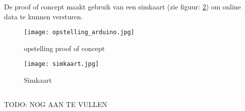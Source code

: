 De proof of concept maakt gebruik van een simkaart (zie figuur: \ref{fig:simkaart}) om online data te kunnen versturen. 
\begin{figure}
	\texttt{[image: opstelling\_arduino.jpg]}
	\caption{opstelling proof of concept}
	\label{fig:opstelling_arduino}
\end{figure}
\begin{figure}
	\texttt{[image: simkaart.jpg]}
	\caption{Simkaart}
	\label{fig:simkaart}
\end{figure}

\subsection{}
TODO: NOG AAN TE VULLEN
\pagebreak
\section{}
\label{ch:backend}


